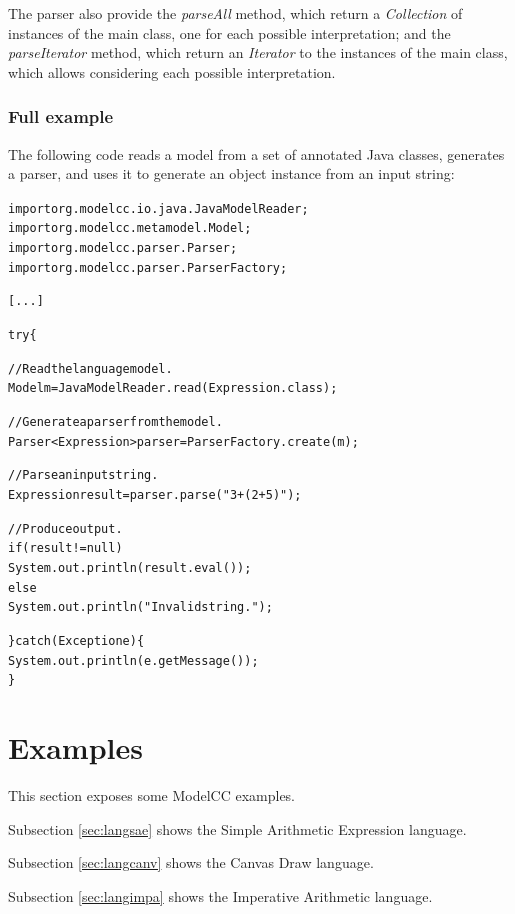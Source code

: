 \documentclass[a4paper,twoside,onecolumn]{article}
\newenvironment{colframe}{%
  \begin{Sbox} 
    \begin{minipage}{.8\columnwidth} 
}{%

  \end{minipage} 
  \end{Sbox} 
  \begin{center} 
    \fcolorbox{black}{MyGray}{\TheSbox} 
  \end{center} 
}
\begin{document}
The parser also provide the \emph{parseAll} method, which return a \emph{Collection} of instances of the main class, one for each possible interpretation; and the \emph{parseIterator} method, which return an \emph{Iterator} to the instances of the main class, which allows considering each possible interpretation.

\subsubsection{Full example} \label{sec:fullexample}

The following code reads a model from a set of annotated Java classes, generates a parser, and uses it to generate an object instance from an input string:

\begin{colframe}
\begin{alltt}
import org.modelcc.io.java.JavaModelReader;
import org.modelcc.metamodel.Model;
import org.modelcc.parser.Parser;
import org.modelcc.parser.ParserFactory;

[...]

try \{

  // Read the language model.
  Model m = JavaModelReader.read(Expression.class);

  // Generate a parser from the model.
  Parser<Expression> parser = ParserFactory.create(m);

  // Parse an input string.
  Expression result = parser.parse("3+(2+5)");

  // Produce output.
  if (result != null)
    System.out.println(result.eval());
  else
    System.out.println("Invalid string.");

\} catch (Exception e) \{
  System.out.println(e.getMessage());
\}
\end{alltt}
\end{colframe}


\section{Examples} \label{sec:examples}

This section exposes some ModelCC examples.

Subsection \ref{sec:langsae} shows the Simple Arithmetic Expression language.

Subsection \ref{sec:langcanv} shows the Canvas Draw language.

Subsection \ref{sec:langimpa} shows the Imperative Arithmetic language.
\end{document}
